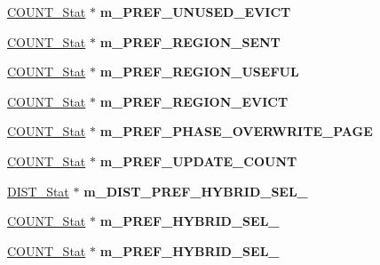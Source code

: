 \begin{DoxyCompactItemize}
\item 
\hypertarget{classall__stats__c_a25a5413d172969345541fe6c620c13f2}{
\hyperlink{classCOUNT__Stat}{COUNT\_\-Stat} $\ast$ {\bfseries m\_\-PREF\_\-UNUSED\_\-EVICT}}
\label{classall__stats__c_a25a5413d172969345541fe6c620c13f2}

\item 
\hypertarget{classall__stats__c_a0326e8ab39593f6202e95826b5ffd185}{
\hyperlink{classCOUNT__Stat}{COUNT\_\-Stat} $\ast$ {\bfseries m\_\-PREF\_\-REGION\_\-SENT}}
\label{classall__stats__c_a0326e8ab39593f6202e95826b5ffd185}

\item 
\hypertarget{classall__stats__c_a9d36cdea24d2554a02350816dc6d4c9a}{
\hyperlink{classCOUNT__Stat}{COUNT\_\-Stat} $\ast$ {\bfseries m\_\-PREF\_\-REGION\_\-USEFUL}}
\label{classall__stats__c_a9d36cdea24d2554a02350816dc6d4c9a}

\item 
\hypertarget{classall__stats__c_a7b6abe90ba464021142da460bef135d2}{
\hyperlink{classCOUNT__Stat}{COUNT\_\-Stat} $\ast$ {\bfseries m\_\-PREF\_\-REGION\_\-EVICT}}
\label{classall__stats__c_a7b6abe90ba464021142da460bef135d2}

\item 
\hypertarget{classall__stats__c_a15584704a868a7bd410c72b5da0e9eed}{
\hyperlink{classCOUNT__Stat}{COUNT\_\-Stat} $\ast$ {\bfseries m\_\-PREF\_\-PHASE\_\-OVERWRITE\_\-PAGE}}
\label{classall__stats__c_a15584704a868a7bd410c72b5da0e9eed}

\item 
\hypertarget{classall__stats__c_a5bd2679d707edc7a6bd74d0297e6e47b}{
\hyperlink{classCOUNT__Stat}{COUNT\_\-Stat} $\ast$ {\bfseries m\_\-PREF\_\-UPDATE\_\-COUNT}}
\label{classall__stats__c_a5bd2679d707edc7a6bd74d0297e6e47b}

\item 
\hypertarget{classall__stats__c_a412475650eb87f2669bff3dda7d71c3c}{
\hyperlink{classDIST__Stat}{DIST\_\-Stat} $\ast$ {\bfseries m\_\-DIST\_\-PREF\_\-HYBRID\_\-SEL\_}}
\label{classall__stats__c_a412475650eb87f2669bff3dda7d71c3c}

\item 
\hypertarget{classall__stats__c_a53f3112d8b0c8a0f8b9fdd7e5cc8d9bd}{
\hyperlink{classCOUNT__Stat}{COUNT\_\-Stat} $\ast$ {\bfseries m\_\-PREF\_\-HYBRID\_\-SEL\_}}
\label{classall__stats__c_a53f3112d8b0c8a0f8b9fdd7e5cc8d9bd}

\item 
\hypertarget{classall__stats__c_a46564518057ea24217d137ca0b37601b}{
\hyperlink{classCOUNT__Stat}{COUNT\_\-Stat} $\ast$ {\bfseries m\_\-PREF\_\-HYBRID\_\-SEL\_}}
\label{classall__stats__c_a46564518057ea24217d137ca0b37601b}


\end{DoxyCompactItemize}
